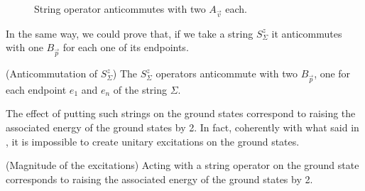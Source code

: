 \documentclass{Configuration_Files/PoliMi3i_thesis}
\begin{document}
\begin{figure}
\begin{center}
	\end{center}
	
	\caption{String operator anticommutes with two $A_{\vec{v}}$ each.}
	\label{fig:Av&string}
\end{figure}


In the same way, we could prove that, if we take a string $S^z_\Sigma$ it anticommutes with one $B_{\vec{p}} $ for each one of its endpoints.

\begin{proposition}(Anticommutation of $S^z_\Sigma$)
	The $S^z_\Sigma$ operators anticommute with two $B_{\vec{p}}$, one for each endpoint $e_1$ and $e_n$ of the string $\Sigma$.
\end{proposition}

The effect of putting such strings on the ground states correspond to raising the associated energy of the ground states by 2. In fact, coherently with what said in {\cite{Her20}}, it is impossible to create unitary excitations on the ground states.

\begin{proposition}(Magnitude of the excitations)
	Acting with a string operator on the ground state corresponds to raising the associated energy of the ground states by 2.
\end{proposition}
\end{document}
